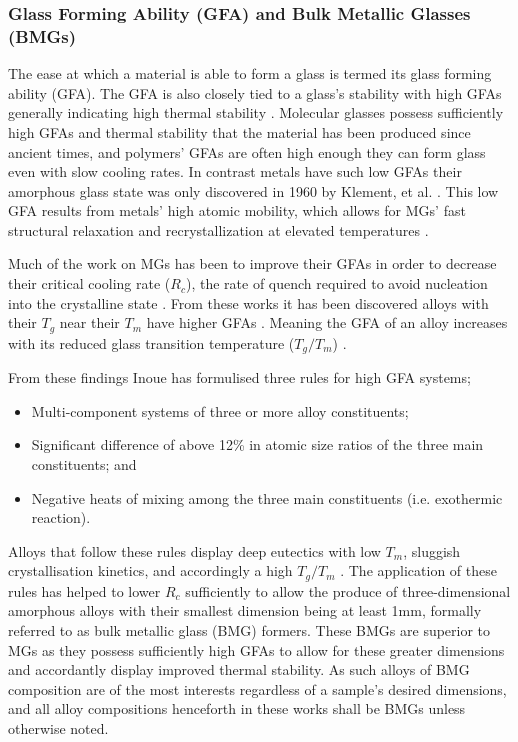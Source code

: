 \documentclass[draft,a4paper,12pt,oneside]{report}%
\begin{document}
\subsubsection{Glass Forming Ability (GFA) and Bulk Metallic Glasses (BMGs)}

The ease at which a material is able to form a glass is termed its glass forming ability (GFA). The GFA is also closely tied to a glass's stability with high GFAs generally indicating high thermal stability \cite{Aji2013}. Molecular glasses possess sufficiently high GFAs and thermal stability that the material has been produced since ancient times, and polymers' GFAs are often high enough they can form glass even with slow cooling rates. In contrast metals have such low GFAs their amorphous glass state was only discovered in 1960 by Klement, et al. \cite{Klement1960}. This low GFA results from metals' high atomic mobility, which allows for  MGs' fast structural relaxation and recrystallization at elevated temperatures  \cite{Aji2013}. 

Much of the work on MGs has been to improve their GFAs in order to decrease their critical cooling rate ($R_{c}$), the rate of quench required to avoid nucleation into the crystalline state \cite{Inoue2000}. From these works it has been discovered alloys with their $T_{g}$ near their $T_{m}$ have higher GFAs \cite{Inoue2000, Trexler2010, Turnbull1969}. Meaning the GFA of an alloy increases with its reduced glass transition temperature ($T_{g}/T_{m}$) \cite{Inoue2000, Trexler2010, Turnbull1969}. 

From these findings Inoue \cite{Inoue2000} has formulised three rules for high GFA systems;

\begin{itemize}
	\item Multi-component systems of three or more alloy constituents;
	\item Significant difference of above 12\% in atomic size ratios of the three main constituents; and
	\item Negative heats of mixing among the three main constituents (i.e. exothermic reaction).
\end{itemize}

Alloys that follow these rules display deep eutectics with low $T_{m}$, sluggish crystallisation kinetics, and accordingly a high $T_{g}/T_{m}$ \cite{Inoue2000, Schroers2010}. The application of these rules has helped to lower $R_{c}$ sufficiently to allow the produce of three-dimensional amorphous alloys with their smallest dimension being at least 1mm, formally referred to as bulk metallic glass (BMG) formers. These BMGs are superior to MGs as they possess sufficiently high GFAs to allow for these greater dimensions and accordantly display improved thermal stability. As such alloys of BMG composition are of the most interests regardless of a sample's desired dimensions, and all alloy compositions henceforth in these works shall be BMGs unless otherwise noted. 
\end{document}

